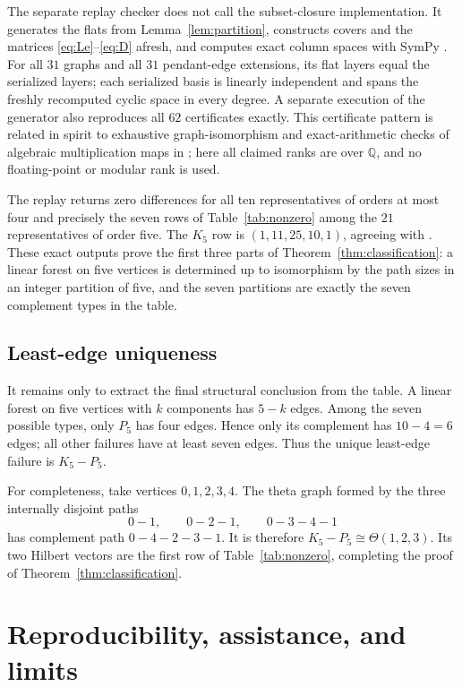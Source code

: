 \documentclass[11pt]{article}
\theoremstyle{remark}
\newcommand{\Q}{\mathbb{Q}}
\begin{document}
The separate replay checker does not call the subset-closure implementation.
It generates the flats from Lemma~\ref{lem:partition}, constructs covers and
the matrices \eqref{eq:Le}--\eqref{eq:D} afresh, and computes exact column
spaces with SymPy \cite{MeurerEtAl2017}.  For all $31$ graphs and all $31$
pendant-edge extensions, its flat layers equal the serialized layers; each
serialized basis is linearly independent and spans the freshly recomputed
cyclic space in every degree.  A separate execution of the generator also
reproduces all $62$ certificates exactly.  This certificate pattern is
related in spirit to exhaustive graph-isomorphism and exact-arithmetic checks
of algebraic multiplication maps in \cite{Zeng2026Whiskered}; here all
claimed ranks are over $\Q$, and no floating-point or modular rank is used.

The replay returns zero differences for all ten representatives of orders at
most four and precisely the seven rows of
Table~\ref{tab:nonzero} among the $21$ representatives of order five.  The
$K_5$ row is $(1,11,25,10,1)$, agreeing with
\cite[Example~3.2]{Sinclair2026}.  These exact outputs prove the first three
parts of Theorem~\ref{thm:classification}: a linear forest on five vertices
is determined up to isomorphism by the path sizes in an integer partition of
five, and the seven partitions are exactly the seven complement types in the
table.

\subsection{Least-edge uniqueness}

It remains only to extract the final structural conclusion from the table.
A linear forest on five vertices with $k$ components has $5-k$ edges.  Among
the seven possible types, only $P_5$ has four edges.  Hence only its
complement has $10-4=6$ edges; all other failures have at least seven edges.
Thus the unique least-edge failure is $K_5-P_5$.

For completeness, take vertices $0,1,2,3,4$.  The theta graph formed by the
three internally disjoint paths
\[
  0-1,\qquad 0-2-1,\qquad 0-3-4-1
\]
has complement path $0-4-2-3-1$.  It is therefore
$K_5-P_5\cong\Theta(1,2,3)$.  Its two Hilbert vectors are the first row of
Table~\ref{tab:nonzero}, completing the proof of
Theorem~\ref{thm:classification}.

\section{Reproducibility, assistance, and limits}
\end{document}
